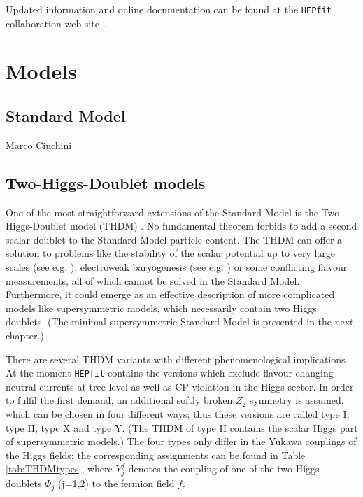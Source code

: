 \documentclass[preprint,3p,12pt]{elsarticle}
\newcommand{\HEPfit}{\texttt{HEPfit}\xspace}
\begin{document}
Updated information and online documentation can be found at the
\HEPfit collaboration web site~\cite{website}.




\section{Models}
\label{sec:Models}

\subsection{Standard Model}
\label{sec:SM}
Marco Ciuchini

\subsection{Two-Higgs-Doublet models}
\label{sec:THDM}

One of the most straightforward extensions of the Standard Model is the Two-Higgs-Doublet model (THDM) \cite{Lee:1973iz,Gunion:2002zf,Branco:2011iw}. No fundamental theorem forbids to add a second scalar doublet to the Standard Model particle content. The THDM can offer a solution to problems like the stability of the scalar potential up to very large scales (see e.g. \cite{Chowdhury:2015yja}), electroweak baryogenesis (see e.g. \cite{Bochkarev:1990fx,Nelson:1991ab,Dorsch:2013wja}) or some conflicting flavour measurements, all of which cannot be solved in the Standard Model. Furthermore, it could emerge as an effective description of more complicated models like supersymmetric models, which necessarily contain two Higgs doublets. (The minimal supersymmetric Standard Model is presented in the next chapter.)

There are several THDM variants with different phenomenological implications. At the moment \HEPfit contains the versions which exclude flavour-changing neutral currents at tree-level as well as CP violation in the Higgs sector. In order to fulfil the first demand, an additional softly broken $Z_2$ symmetry is assumed, which can be chosen in four different ways; thus these versions are called type I, type II, type X and type Y. (The THDM of type II contains the scalar Higgs part of supersymmetric models.) The four types only differ in the Yukawa couplings of the Higgs fields; the corresponding assignments can be found in Table \ref{tab:THDMtypes}, where $Y^f_j$ denotes the coupling of one of the two Higgs doublets $\Phi_j$ (j=1,2) to the fermion field $f$.
\end{document}
